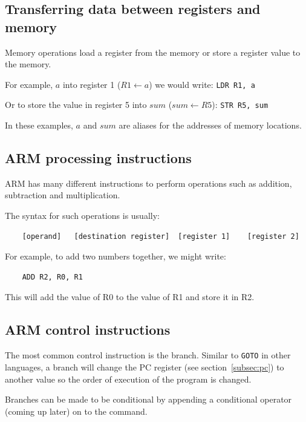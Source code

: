 \documentclass{article}
\begin{document}
\subsection{Transferring data between registers and memory}

Memory operations load a register from the memory or store a register value to the memory.

For example, $a$ into register 1 ($R1 \leftarrow a$) we would write:
{\tt LDR R1, a}

Or to store the value in register 5 into $sum$ ($sum \leftarrow R5$):
{\tt STR R5, sum}

In these examples, $a$ and $sum$ are aliases for the addresses of memory locations.

\subsection{ARM processing instructions}

ARM has many different instructions to perform operations such as addition, subtraction and multiplication.

The syntax for such operations is usually:

\begin{verbatim}
	[operand]	[destination register]	[register 1]	[register 2]
\end{verbatim}

For example, to add two numbers together, we might write:

\begin{verbatim}
	ADD	R2, R0, R1
\end{verbatim}

This will add the value of R0 to the value of R1 and store it in R2.

\subsection{ARM control instructions}

The most common control instruction is the branch. Similar to \texttt{GOTO} in other languages, a branch will change the PC register (see section~\ref{subsec:pc}) to another value so the order of execution of the program is changed.


Branches can be made to be conditional by appending a conditional operator (coming up later) on to the command.
\end{document}
